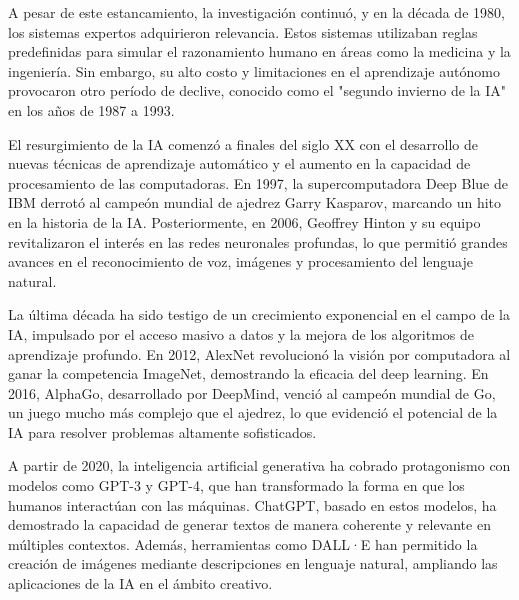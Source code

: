 \documentclass[14pt]{extarticle}
\begin{document}
  \vspace{0.3cm}
  A pesar de este estancamiento, la investigación continuó, y en la década de 1980, los sistemas expertos adquirieron relevancia. Estos sistemas utilizaban reglas predefinidas para simular el razonamiento humano en áreas como la medicina y la ingeniería. Sin embargo, su alto costo y limitaciones en el aprendizaje autónomo provocaron otro período de declive, conocido como el "segundo invierno de la IA" en los años de 1987 a 1993.

  \vspace{0.3cm}
  El resurgimiento de la IA comenzó a finales del siglo XX con el desarrollo de nuevas técnicas de aprendizaje automático y el aumento en la capacidad de procesamiento de las computadoras. En 1997, la supercomputadora Deep Blue de IBM derrotó al campeón mundial de ajedrez Garry Kasparov, marcando un hito en la historia de la IA. Posteriormente, en 2006, Geoffrey Hinton y su equipo revitalizaron el interés en las redes neuronales profundas, lo que permitió grandes avances en el reconocimiento de voz, imágenes y procesamiento del lenguaje natural.

  \vspace{0.3cm}
  La última década ha sido testigo de un crecimiento exponencial en el campo de la IA, impulsado por el acceso masivo a datos y la mejora de los algoritmos de aprendizaje profundo. En 2012, AlexNet revolucionó la visión por computadora al ganar la competencia ImageNet, demostrando la eficacia del deep learning. En 2016, AlphaGo, desarrollado por DeepMind, venció al campeón mundial de Go, un juego mucho más complejo que el ajedrez, lo que evidenció el potencial de la IA para resolver problemas altamente sofisticados.

  \vspace{0.3cm}
  A partir de 2020, la inteligencia artificial generativa ha cobrado protagonismo con modelos como GPT-3 y GPT-4, que han transformado la forma en que los humanos interactúan con las máquinas. ChatGPT, basado en estos modelos, ha demostrado la capacidad de generar textos de manera coherente y relevante en múltiples contextos. Además, herramientas como DALL·E han permitido la creación de imágenes mediante descripciones en lenguaje natural, ampliando las aplicaciones de la IA en el ámbito creativo.
\end{document}
